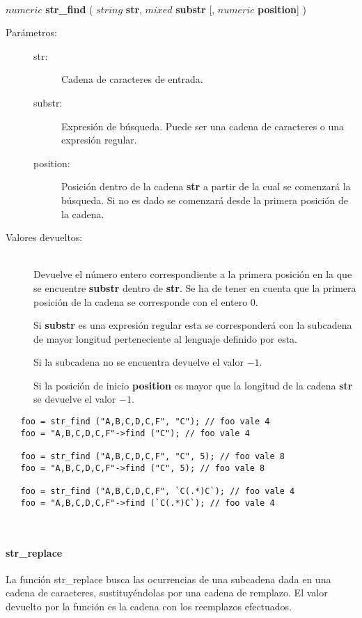 \hfill \\ $numeric$ \textbf{str\_find} ( $string$ \textbf{str}, $mixed$ \textbf{substr} [, $numeric$ \textbf{position}] )  
\begin{description}
\item [Parámetros:] \hfill 
   \begin{description}
   \item[str:] Cadena de caracteres de entrada.
   \item[substr:] Expresión de búsqueda. Puede ser una cadena de caracteres o una expresión regular.  
   \item[position:] Posición dentro de la cadena \textbf{str} a partir de la cual se comenzará la búsqueda. Si no es dado 
   se comenzará desde la primera posición de la cadena.
   \end{description}
\item[Valores devueltos:] \hfill \\
   Devuelve el número entero correspondiente a la primera posición en la que se encuentre \textbf{substr} dentro de \textbf{str}. 
   Se ha de tener en cuenta que la primera posición de la cadena se corresponde con el entero $0$.
   
   Si \textbf{substr} es una expresión regular esta se corresponderá con la subcadena de mayor longitud perteneciente al 
   lenguaje definido por esta. 
   
   Si la subcadena no se encuentra devuelve el valor $-1$. 
   
   Si la posición de inicio \textbf{position} es mayor que la longitud de la cadena \textbf{str} se devuelve el valor $-1$. 
\end{description}

\begin{lstlisting}
   foo = str_find ("A,B,C,D,C,F", "C"); // foo vale 4  
   foo = "A,B,C,D,C,F"->find ("C"); // foo vale 4

   foo = str_find ("A,B,C,D,C,F", "C", 5); // foo vale 8 
   foo = "A,B,C,D,C,F"->find ("C", 5); // foo vale 8
   
   foo = str_find ("A,B,C,D,C,F", `C(.*)C`); // foo vale 4
   foo = "A,B,C,D,C,F"->find (`C(.*)C`); // foo vale 4
\end{lstlisting}
\hfill\\ 

\paragraph {str\_replace}
La función str\_replace busca las ocurrencias de una subcadena dada en una cadena de caracteres, sustituyéndolas
por una cadena de remplazo. El valor devuelto por la función es la cadena con los reemplazos efectuados. \\

